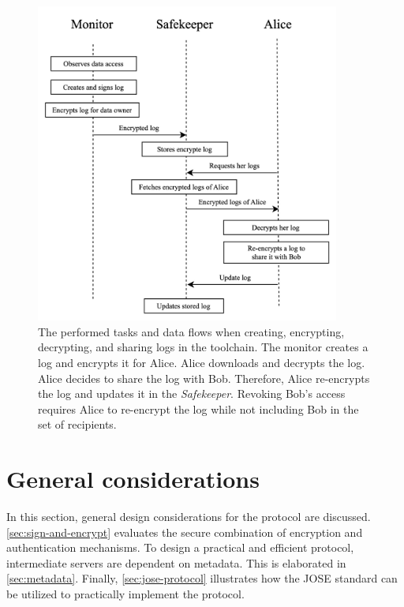 \documentclass[../main.tex]{subfiles}
\begin{document}
\begin{figure}[h!]
    \includegraphics[width=10cm]{../img/05/overview.jpg}
    \centering
    \caption[Protocol overview]{
        The performed tasks and data flows when creating, encrypting, decrypting, and sharing logs in the toolchain.
        The monitor creates a log and encrypts it for Alice.
        Alice downloads and decrypts the log.
        Alice decides to share the log with Bob.
        Therefore, Alice re-encrypts the log and updates it in the \emph{Safekeeper}.
        Revoking Bob's access requires Alice to re-encrypt the log while not including Bob in the set of recipients.
    }
    \label{fig:protocol-overview}
\end{figure}

\section{General considerations}
\label{sec:protocol-considerations}
In this section, general design considerations for the protocol are discussed.
\cref{sec:sign-and-encrypt} evaluates the secure combination of encryption and authentication mechanisms.
To design a practical and efficient protocol, intermediate servers are dependent on metadata.
This is elaborated in \cref{sec:metadata}.
Finally, \cref{sec:jose-protocol} illustrates how the JOSE standard can be utilized to practically implement the protocol.
\end{document}
